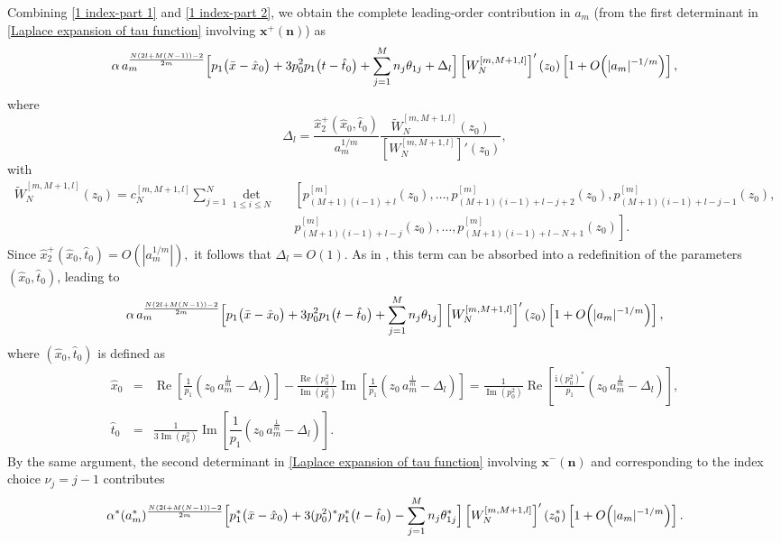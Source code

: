 \documentclass[preprint,3p,10pt]{elsarticle}
\renewcommand{\Re}{\operatorname{Re}}
\renewcommand{\Im}{\operatorname{Im}}
\theoremstyle{definition}
\begin{document}
Combining \eqref{1 index-part 1} and \eqref{1 index-part 2}, we obtain the complete leading-order contribution in $a_m$
(from the first determinant in \eqref{Laplace expansion of tau function} involving $\mathbf{x}^{+}(\mathbf{n})$) as \cite{yang2023rogue}
\begin{equation*}
  \alpha\, a_m^{\frac{N(2l+M(N-1))-2}{2m}}
  \Bigl[
      p_1\bigl(\bar{x}-\hat{x}_0\bigr)
      + 3p_0^2p_1 \bigl(t-\hat{t}_0\bigr)
      +\sum_{j=1}^{M} n_j \theta_{1j}
      +\Delta_l
  \Bigr]
  \left[W_{N}^{[m,M+1,l]}\right]'(z_0)
  \left[1+O\!\left(|a_m|^{-1/m}\right)\right],
\end{equation*}
where
\begin{equation}\label{eqn:def of delta_l}
  \Delta_l
  =
  \frac{\hat{x}_2^{+}(\hat{x}_0,\hat{t}_0)}{a_m^{1/m}}
  \frac{
       \widetilde{W}_{N}^{[m,M+1,l]} (z_0)
  }{
      \left[W_{N}^{[m,M+1,l]}\right]'(z_0)
  },
\end{equation}
with
\begin{eqnarray}\label{eqn: two term delta}
    \widetilde{W}_{N}^{[m,M+1,l]} (z_0)=c_N^{[m,M+1,l]}\sum_{j=1}^{N}
  \det_{1\le i\le N}
  &&\left[
      p_{(M+1)(i-1)+l}^{[m]}(z_0),\ldots,
      p_{(M+1)(i-1)+l-j+2}^{[m]}(z_0),
      p_{(M+1)(i-1)+l-j-1}^{[m]}(z_0),\right.\nonumber\\
      &&\left.
      p_{(M+1)(i-1)+l-j}^{[m]}(z_0),\ldots,
      p_{(M+1)(i-1)+l-N+1}^{[m]}(z_0)
  \right].
\end{eqnarray}
Since $\hat{x}_2^{+}(\hat{x}_0,\hat{t}_0)
  = O \left(|a_m^{1/m}|\right),$
it follows that $\Delta_l=O(1)$. 
As in \cite{yang2023rogue}, this term can be absorbed into a redefinition of the parameters
$(\hat{x}_0,\hat{t}_0)$, leading to
\begin{equation}
  \alpha\, a_m^{\frac{N(2l+M(N-1))-2}{2m}}
  \Bigl[
      p_1\bigl(\bar{x}-\hat{x}_0\bigr)
      + 3p_0^2p_1 \bigl(t-\hat{t}_0\bigr)
      +\sum_{j=1}^{M} n_j \theta_{1j}
  \Bigr]
  \left[W_{N}^{[m,M+1,l]}\right]'(z_0)
  \left[1+O\!\left(|a_m|^{-1/m}\right)\right],
\end{equation}
where $(\hat{x}_0,\hat{t}_0)$ is defined as
\begin{eqnarray}
\hat{x}_0&=&\Re\!\left[\frac{1}{p_1}\left(z_0\,a_m^{\frac{1}{m}}-\Delta_l\right)\right]- 
\frac{\Re(p_0^2)}{\Im(p_0^2)}\Im\!\left[\frac{1}{p_1}\left(z_0\,a_m^{\frac{1}{m}}-\Delta_l\right)\right] = \frac{1}{\Im(p_0^2)}\Re\!\left[\frac{\mathrm{i}\left(p_0^2\right)^*}{p_1} \left(z_0\,a_m^{\frac{1}{m}}-\Delta_l\right)\right], \\
\hat{t}_0&=&\frac{1}{3\Im(p_0^2)}\Im\!\left[\dfrac{1}{p_1} \left(z_0\,a_m^{\frac{1}{m}}-\Delta_l\right)\right].
\end{eqnarray}
By the same argument, the second determinant in
\eqref{Laplace expansion of tau function} involving $\mathbf{x}^{-}(\mathbf{n})$
and corresponding to the index choice $\nu_j=j-1$ contributes
\begin{equation}
  \alpha^{*} (a_m^{*})^{\frac{N(2l+M(N-1))-2}{2m}}
  \Bigl[
      p_1^{*}\bigl(\bar{x}-\hat{x}_0\bigr)
      +3(p_0^2)^*p_1^*\bigl(t-\hat{t}_0\bigr)
      -\sum_{j=1}^{M} n_j \theta_{1j}^{*}
  \Bigr]
  \left[W_{N}^{[m,M+1,l]}\right]'(z_0^{*})
  \left[1+O\!\left(|a_m|^{-1/m}\right)\right].
\end{equation}
\end{document}
